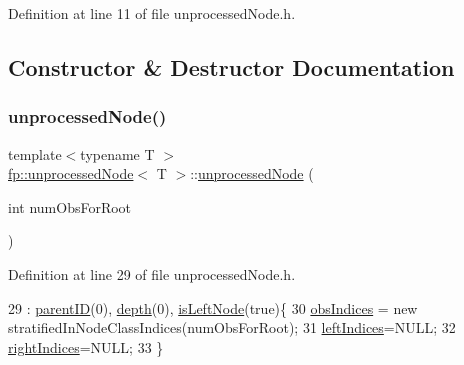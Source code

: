 Definition at line 11 of file unprocessed\+Node.\+h.



\subsection{Constructor \& Destructor Documentation}
\mbox{\label{classfp_1_1unprocessedNode_ae4835a9b488d992f299dbad40c943ae9}} 
\subsubsection{\texorpdfstring{unprocessed\+Node()}{unprocessedNode()}\hspace{0.1cm}{\footnotesize\ttfamily [1/4]}}
{\footnotesize\ttfamily template$<$typename T $>$ \\
\hyperlink{classfp_1_1unprocessedNode}{fp\+::unprocessed\+Node}$<$ T $>$\+::\hyperlink{classfp_1_1unprocessedNode}{unprocessed\+Node} (\begin{DoxyParamCaption}\item[{int}]{num\+Obs\+For\+Root }\end{DoxyParamCaption})\hspace{0.3cm}{\ttfamily [inline]}}



Definition at line 29 of file unprocessed\+Node.\+h.


\begin{DoxyCode}
29                                                   :  \hyperlink{classfp_1_1unprocessedNode_a74cb75f76c24622444e531a583b75c3d}{parentID}(0), \hyperlink{classfp_1_1unprocessedNode_a22ebfbc35a57e2d30b81220c94f4d0d3}{depth}(0), 
      \hyperlink{classfp_1_1unprocessedNode_a81b74c36ed1ac15d367e135e2fa0ba3d}{isLeftNode}(\textcolor{keyword}{true})\{
30                     \hyperlink{classfp_1_1unprocessedNode_aba9f03124658f62906fa8ded53cef535}{obsIndices} = \textcolor{keyword}{new} stratifiedInNodeClassIndices(numObsForRoot);
31                     \hyperlink{classfp_1_1unprocessedNode_a8e39fa0144bbb78fd02d1973bd05b5f6}{leftIndices}=NULL;
32                     \hyperlink{classfp_1_1unprocessedNode_ac6886f626536370b1276374d4939291e}{rightIndices}=NULL;
33                 \}
\end{DoxyCode}
\mbox{\label{classfp_1_1unprocessedNode_ac8c960894806adf6ca652a60f5d11e4a}} 
